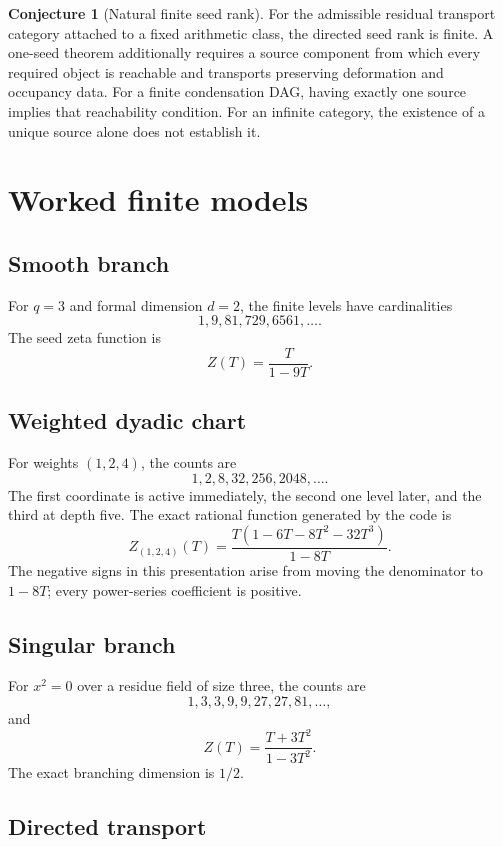 \documentclass[11pt]{article}
\theoremstyle{definition}
\newtheorem{conjecture}[theorem]{Conjecture}
\theoremstyle{remark}
\begin{document}
\begin{conjecture}[Natural finite seed rank]
For the admissible residual transport category attached to a fixed arithmetic class, the directed seed rank is finite.  A one-seed theorem additionally requires a source component from which every required object is reachable and transports preserving deformation and occupancy data.  For a finite condensation DAG, having exactly one source implies that reachability condition.  For an infinite category, the existence of a unique source alone does not establish it.
\end{conjecture}

\section{Worked finite models}

\subsection{Smooth branch}

For \(q=3\) and formal dimension \(d=2\), the finite levels have cardinalities
\[
1,9,81,729,6561,\ldots.
\]
The seed zeta function is
\[
Z(T)=\frac{T}{1-9T}.
\]

\subsection{Weighted dyadic chart}

For weights \((1,2,4)\), the counts are
\[
1,2,8,32,256,2048,\ldots.
\]
The first coordinate is active immediately, the second one level later, and the third at depth five.  The exact rational function generated by the code is
\[
Z_{(1,2,4)}(T)
=
\frac{T(1-6T-8T^2-32T^3)}{1-8T}.
\]
The negative signs in this presentation arise from moving the denominator to \(1-8T\); every power-series coefficient is positive.

\subsection{Singular branch}

For \(x^2=0\) over a residue field of size three, the counts are
\[
1,3,3,9,9,27,27,81,\ldots,
\]
and
\[
Z(T)=\frac{T+3T^2}{1-3T^2}.
\]
The exact branching dimension is \(1/2\).

\subsection{Directed transport}
\end{document}
